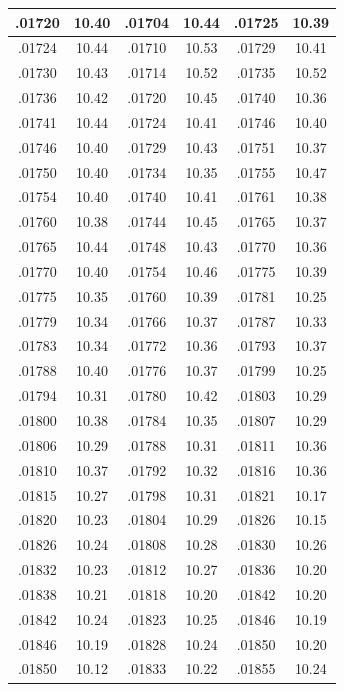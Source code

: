 \documentclass[10pt,twoside]{report}
\begin{document}
\begin{appendices}
\begin{longtable}{|c|c||c|c||c|c|}
.01720 & 10.40 & .01704 & 10.44 & .01725 & 10.39\\\hline
.01724 & 10.44 & .01710 & 10.53 & .01729 & 10.41\\\hline
.01730 & 10.43 & .01714 & 10.52 & .01735 & 10.52\\\hline
.01736 & 10.42 & .01720 & 10.45 & .01740 & 10.36\\\hline
.01741 & 10.44 & .01724 & 10.41 & .01746 & 10.40\\\hline
.01746 & 10.40 & .01729 & 10.43 & .01751 & 10.37\\\hline
.01750 & 10.40 & .01734 & 10.35 & .01755 & 10.47\\\hline
.01754 & 10.40 & .01740 & 10.41 & .01761 & 10.38\\\hline
.01760 & 10.38 & .01744 & 10.45 & .01765 & 10.37\\\hline
.01765 & 10.44 & .01748 & 10.43 & .01770 & 10.36\\\hline
.01770 & 10.40 & .01754 & 10.46 & .01775 & 10.39\\\hline
.01775 & 10.35 & .01760 & 10.39 & .01781 & 10.25\\\hline
.01779 & 10.34 & .01766 & 10.37 & .01787 & 10.33\\\hline
.01783 & 10.34 & .01772 & 10.36 & .01793 & 10.37\\\hline
.01788 & 10.40 & .01776 & 10.37 & .01799 & 10.25\\\hline
.01794 & 10.31 & .01780 & 10.42 & .01803 & 10.29\\\hline
.01800 & 10.38 & .01784 & 10.35 & .01807 & 10.29\\\hline
.01806 & 10.29 & .01788 & 10.31 & .01811 & 10.36\\\hline
.01810 & 10.37 & .01792 & 10.32 & .01816 & 10.36\\\hline
.01815 & 10.27 & .01798 & 10.31 & .01821 & 10.17\\\hline
.01820 & 10.23 & .01804 & 10.29 & .01826 & 10.15\\\hline
.01826 & 10.24 & .01808 & 10.28 & .01830 & 10.26\\\hline
.01832 & 10.23 & .01812 & 10.27 & .01836 & 10.20\\\hline
.01838 & 10.21 & .01818 & 10.20 & .01842 & 10.20\\\hline
.01842 & 10.24 & .01823 & 10.25 & .01846 & 10.19\\\hline
.01846 & 10.19 & .01828 & 10.24 & .01850 & 10.20\\\hline
.01850 & 10.12 & .01833 & 10.22 & .01855 & 10.24\\\hline

\end{longtable}
\end{appendices}
\end{document}
